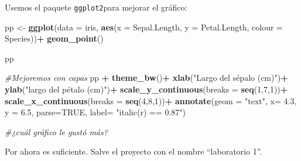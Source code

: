 \documentclass[
]{article}
\newenvironment{Shaded}{\begin{snugshade}}{\end{snugshade}}
\newcommand{\CommentTok}[1]{\textcolor[rgb]{0.56,0.35,0.01}{\textit{#1}}}
\newcommand{\DataTypeTok}[1]{\textcolor[rgb]{0.13,0.29,0.53}{#1}}
\newcommand{\DecValTok}[1]{\textcolor[rgb]{0.00,0.00,0.81}{#1}}
\newcommand{\FloatTok}[1]{\textcolor[rgb]{0.00,0.00,0.81}{#1}}
\newcommand{\KeywordTok}[1]{\textcolor[rgb]{0.13,0.29,0.53}{\textbf{#1}}}
\newcommand{\NormalTok}[1]{#1}
\newcommand{\OperatorTok}[1]{\textcolor[rgb]{0.81,0.36,0.00}{\textbf{#1}}}
\newcommand{\OtherTok}[1]{\textcolor[rgb]{0.56,0.35,0.01}{#1}}
\newcommand{\StringTok}[1]{\textcolor[rgb]{0.31,0.60,0.02}{#1}}
\begin{document}
Usemos el paquete \texttt{ggplot2}para mejorar el gráfico:

\begin{Shaded}
\begin{Highlighting}[]
\NormalTok{pp <-}\StringTok{ }\KeywordTok{ggplot}\NormalTok{(}\DataTypeTok{data =}\NormalTok{ iris, }\KeywordTok{aes}\NormalTok{(}\DataTypeTok{x =}\NormalTok{ Sepal.Length, }\DataTypeTok{y =}\NormalTok{ Petal.Length, }\DataTypeTok{colour =}\NormalTok{ Species))}\OperatorTok{+}
\StringTok{      }\KeywordTok{geom_point}\NormalTok{()}
  
\NormalTok{pp  }
  
\CommentTok{#Mejoremos con capas}
\NormalTok{pp }\OperatorTok{+}\StringTok{  }\KeywordTok{theme_bw}\NormalTok{()}\OperatorTok{+}
\StringTok{      }\KeywordTok{xlab}\NormalTok{(}\StringTok{"Largo del sépalo (cm)"}\NormalTok{)}\OperatorTok{+}
\StringTok{      }\KeywordTok{ylab}\NormalTok{(}\StringTok{"largo del pétalo (cm)"}\NormalTok{)}\OperatorTok{+}
\StringTok{      }\KeywordTok{scale_y_continuous}\NormalTok{(}\DataTypeTok{breaks =} \KeywordTok{seq}\NormalTok{(}\DecValTok{1}\NormalTok{,}\DecValTok{7}\NormalTok{,}\DecValTok{1}\NormalTok{))}\OperatorTok{+}
\StringTok{      }\KeywordTok{scale_x_continuous}\NormalTok{(}\DataTypeTok{breaks =} \KeywordTok{seq}\NormalTok{(}\DecValTok{4}\NormalTok{,}\DecValTok{8}\NormalTok{,}\DecValTok{1}\NormalTok{))}\OperatorTok{+}
\StringTok{      }\KeywordTok{annotate}\NormalTok{(}\DataTypeTok{geom =} \StringTok{"text"}\NormalTok{, }\DataTypeTok{x=} \FloatTok{4.3}\NormalTok{, }\DataTypeTok{y =} \FloatTok{6.5}\NormalTok{, }\DataTypeTok{parse=}\OtherTok{TRUE}\NormalTok{, }\DataTypeTok{label=} \StringTok{"italic(r) == 0.87"}\NormalTok{)}
      
\CommentTok{#¿cuál gráfico le gustó más? }
\end{Highlighting}
\end{Shaded}

Por ahora es suficiente. Salve el proyecto con el nombre ``laboratorio
1''.
\end{document}
